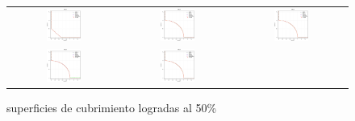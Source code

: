 \begin{figure}[H]
\caption{superficies de cubrimiento logradas al 50\%}%
\begin{tabular}{ccc}
  \includegraphics[width=0.33\textwidth]{Figures_Chapter7/Results_Chapter4/Surface_Representative/DTLZ1.eps}  &
  \includegraphics[width=0.33\textwidth]{Figures_Chapter7/Results_Chapter4/Surface_Representative/DTLZ2.eps} &
  \includegraphics[width=0.33\textwidth]{Figures_Chapter7/Results_Chapter4/Surface_Representative/DTLZ3.eps} \\
  \includegraphics[width=0.33\textwidth]{Figures_Chapter7/Results_Chapter4/Surface_Representative/DTLZ4.eps} &
  \includegraphics[width=0.33\textwidth]{Figures_Chapter7/Results_Chapter4/Surface_Representative/DTLZ5.eps} &

\end{tabular}
\end{figure}
